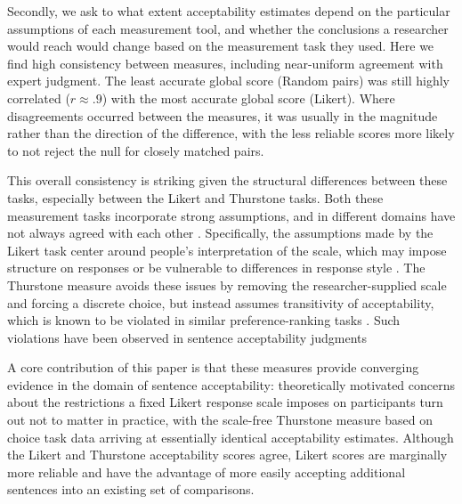 \documentclass[doc]{apa6}
\newcommand{\rndchoice}{{\sc Random pairs}}
\newcommand{\thurstone}{{\sc Thurstone}}
\newcommand{\likert}{{\sc Likert}}
\newcommand{\choicetask}{choice task}
\begin{document}
Secondly, we ask to what extent acceptability estimates depend on the particular assumptions of each measurement tool, and whether the conclusions a researcher would reach would change based on the measurement task they used.
Here we find high consistency between measures, including near-uniform agreement with expert judgment. The least accurate global score (\rndchoice) was still highly correlated ($r\approx.9$)
with the most accurate global score (\likert). Where disagreements occurred between the measures, it was usually in the magnitude rather than the direction of the difference, with the less reliable scores more likely to not reject the null for closely matched pairs.

This overall consistency is striking given the structural differences between these tasks, especially between the \likert{} and \thurstone{} tasks. Both these measurement tasks incorporate strong assumptions, and in different domains have not always agreed with each other \citep{roberts1999thurstonelikertvaliditycomparison,drasgow2010thurstonewasright}.
Specifically, the assumptions made by the \likert{} task center around people's interpretation of the scale, which may impose structure on responses \citep{carifio2008debatelikert,schutze1996empiricalbase} or be vulnerable to differences in response style \citep{johnson2003likertresponsestyle,lee2002crossculturallikert}. The \thurstone{} measure avoids these issues by removing the researcher-supplied scale and forcing a discrete choice, but instead assumes transitivity of acceptability, which is known to be violated in similar preference-ranking tasks \citep{tversky1969intransitivity}. Such violations have been observed in sentence acceptability judgments \citep{hindle1975nontransitiveanymore, danks1970scalinglinguistic}

A core contribution of this paper is that these measures provide converging evidence in the domain of sentence acceptability: theoretically motivated concerns about the restrictions a fixed \likert{} response scale imposes on participants turn out not to matter in practice, with the scale-free \thurstone{} measure based on \choicetask{ }data arriving at essentially identical acceptability estimates.
Although the \likert{} and \thurstone{} acceptability scores agree, \likert{} scores are marginally more reliable and have the advantage of more easily accepting additional sentences into an existing set of comparisons.
\end{document}
